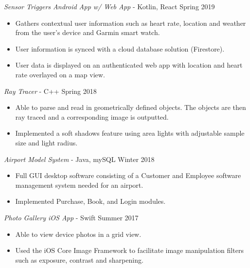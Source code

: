 \documentclass[margin]{res}
\begin{document}
\begin{resume}
\begin{itemize}
				\end{itemize}
				
				{\sl Sensor Triggers Android App w/ Web App} - Kotlin, React \hfill Spring 2019
                 \begin{itemize}  \itemsep -2pt %
                 \item Gathers contextual user information such as heart rate, location and weather from the user's device and Garmin smart watch.
                \item   User information is synced with a cloud database solution (Firestore).
                \item User data is displayed on an authenticated web app with location and heart rate overlayed on a map view.
                \end{itemize}

                {\sl Ray Tracer} - C++ \hfill            Spring 2018
                 \begin{itemize}  \itemsep -2pt %
                 \item Able to parse and read in geometrically defined objects. The objects are then ray traced and a corresponding image is outputted.
                 \item Implemented a soft shadows feature using area lights with adjustable sample size and light radius.
                 \end{itemize}

                {\sl Airport Model System} - Java, mySQL \hfill        Winter 2018
                  \begin{itemize}
                   \item Full GUI desktop software consisting of a Customer and Employee software management system needed for an airport.
                   \item Implemented Purchase, Book, and Login modules.
                   \end{itemize}
               
                {\sl Photo Gallery iOS App} - Swift \hfill            Summer 2017
               \begin{itemize}  \itemsep -2pt %
               	\item Able to view device photos in a grid view.
               	\item Used the iOS Core Image Framework to facilitate image manipulation filters such as exposure, contrast and sharpening.
               \end{itemize}


\end{resume}
\end{document}
